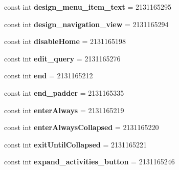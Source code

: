 \begin{DoxyCompactItemize}
\item 
\mbox{\label{classXaria_1_1Resource_1_1Id_aa804eef7968c85cf8b3399e043fd8a3b}} 
const int {\bfseries design\+\_\+menu\+\_\+item\+\_\+text} = 2131165295
\item 
\mbox{\label{classXaria_1_1Resource_1_1Id_a0b9074b406f1c89d25306296e6ca159d}} 
const int {\bfseries design\+\_\+navigation\+\_\+view} = 2131165294
\item 
\mbox{\label{classXaria_1_1Resource_1_1Id_ab8c10cc3b45fc76831513e7df22326b8}} 
const int {\bfseries disable\+Home} = 2131165198
\item 
\mbox{\label{classXaria_1_1Resource_1_1Id_ab863398e5cc47f8900d796f2889303ec}} 
const int {\bfseries edit\+\_\+query} = 2131165276
\item 
\mbox{\label{classXaria_1_1Resource_1_1Id_a60885e704c6d1ce5dc5d67c65f848a96}} 
const int {\bfseries end} = 2131165212
\item 
\mbox{\label{classXaria_1_1Resource_1_1Id_a657b8da5af2be3151b295aaa140279e5}} 
const int {\bfseries end\+\_\+padder} = 2131165335
\item 
\mbox{\label{classXaria_1_1Resource_1_1Id_ac55d512d97e716a4b98cdb63f77cada9}} 
const int {\bfseries enter\+Always} = 2131165219
\item 
\mbox{\label{classXaria_1_1Resource_1_1Id_ac78d7a8af1a4b325fc123cd9512fa553}} 
const int {\bfseries enter\+Always\+Collapsed} = 2131165220
\item 
\mbox{\label{classXaria_1_1Resource_1_1Id_a3129b0bb7ebf720b98c756b39468a6e2}} 
const int {\bfseries exit\+Until\+Collapsed} = 2131165221
\item 
\mbox{\label{classXaria_1_1Resource_1_1Id_a93bfb9312ce7c5412019a23a82bac3e9}} 
const int {\bfseries expand\+\_\+activities\+\_\+button} = 2131165246
\item 

\end{DoxyCompactItemize}
